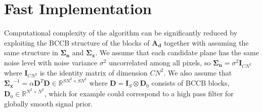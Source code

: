 \documentclass{article}
\begin{document}
\section{Fast Implementation}
Computational complexity of the algorithm can be significantly reduced by
exploiting the BCCB structure of the blocks of $\bm {A_d}$ together with
assuming the same structure in $\bm {\Sigma_n}$ and $\bm {\Sigma_x}$. We assume
that each candidate plane has the same noise level with noise variance
$\sigma^2$ uncorrelated among all pixels, so $\bm {\Sigma_n} = \sigma^2 \bm
I_{CN^2}$ where $\bm I_{CN^2}$ is the identity matrix of dimension $CN^2$. We
also assume that $\bm {\Sigma_{x}}^{-1}= \alpha \bm D ^T \bm D \in \mathbb
R^{SN^2 \times SN^2}$ where $\bm D =\bm I_S \otimes \bm D_0 $ consists of BCCB
blocks, $\bm D_0 \in \mathbb R^{N^2 \times N^2}$, which for example could
correspond to a high pass filter for globally smooth signal prior.
\end{document}
